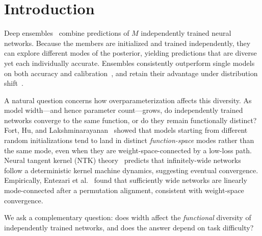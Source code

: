\documentclass[11pt]{article}
\begin{document}
\section{Introduction}
\label{sec:intro}

Deep ensembles~\citep{lakshminarayanan2017simple} combine predictions of
$M$ independently trained neural networks.  Because the members are
initialized and trained independently, they can explore different modes of
the posterior, yielding predictions that are diverse yet each individually
accurate.  Ensembles consistently outperform single models on both
accuracy and calibration~\citep{ovadia2019can,gustafsson2020evaluating},
and retain their advantage under distribution
shift~\citep{hendrycks2019robustness}.

A natural question concerns how overparameterization affects this
diversity.  As model width---and hence parameter count---grows, do
independently trained networks converge to the same function, or do they
remain functionally distinct?  Fort, Hu, and
Lakshminarayanan~\citeyearpar{fort2019deep} showed that models starting
from different random initializations tend to land in distinct
\emph{function-space} modes rather than the same mode, even when they are
weight-space-connected by a low-loss path.  Neural tangent kernel (NTK)
theory~\citep{jacot2018neural} predicts that infinitely-wide networks
follow a deterministic kernel machine dynamics, suggesting eventual
convergence.  Empirically, Entezari et al.~\citeyearpar{entezari2022role}
found that sufficiently wide networks are linearly mode-connected after a
permutation alignment, consistent with weight-space convergence.

We ask a complementary question: does width affect the \emph{functional}
diversity of independently trained networks, and does the answer depend on
task difficulty?
\end{document}
